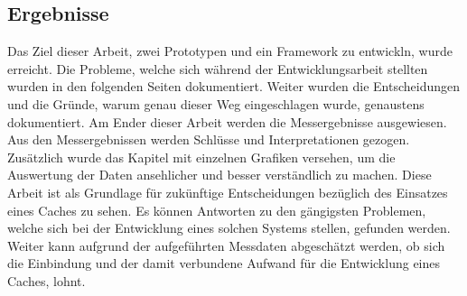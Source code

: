 \subsection*{Ergebnisse}
Das Ziel dieser Arbeit, zwei Prototypen und ein Framework zu entwickln, wurde erreicht. Die Probleme, welche sich während der Entwicklungsarbeit stellten wurden in den folgenden Seiten dokumentiert. Weiter wurden die Entscheidungen und die Gründe, warum genau dieser Weg eingeschlagen wurde, genaustens dokumentiert.\newline
Am Ender dieser Arbeit werden die Messergebnisse ausgewiesen. Aus den Messergebnissen werden Schlüsse und Interpretationen gezogen. Zusätzlich wurde das Kapitel mit einzelnen Grafiken versehen, um die Auswertung der Daten ansehlicher und besser verständlich zu machen.\newline
Diese Arbeit ist als Grundlage für zukünftige Entscheidungen bezüglich des Einsatzes eines Caches zu sehen. Es können Antworten zu den gängigsten Problemen, welche sich bei der Entwicklung eines solchen Systems stellen, gefunden werden. Weiter kann aufgrund der aufgeführten Messdaten abgeschätzt werden, ob sich die Einbindung und der damit verbundene Aufwand für die Entwicklung eines Caches, lohnt.
